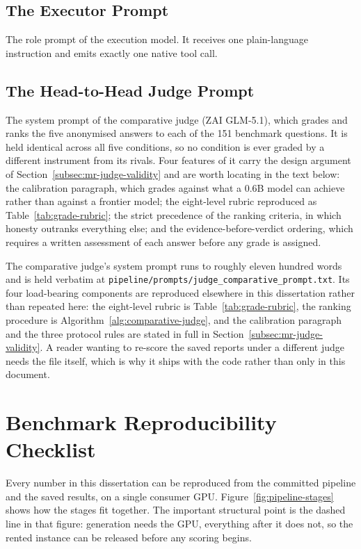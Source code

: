 \section*{The Executor Prompt}
The role prompt of the execution model. It receives one plain-language instruction and emits exactly one native tool call.



\section*{The Head-to-Head Judge Prompt}

The system prompt of the comparative judge (ZAI GLM-5.1), which grades and ranks the five anonymised answers to each of the 151 benchmark questions. It is held identical across all five conditions, so no condition is ever graded by a different instrument from its rivals. Four features of it carry the design argument of Section~\ref{subsec:mr-judge-validity} and are worth locating in the text below: the calibration paragraph, which grades against what a 0.6B model can achieve rather than against a frontier model; the eight-level rubric reproduced as Table~\ref{tab:grade-rubric}; the strict precedence of the ranking criteria, in which honesty outranks everything else; and the evidence-before-verdict ordering, which requires a written assessment of each answer before any grade is assigned.

The comparative judge's system prompt runs to roughly eleven hundred words and is held verbatim at \texttt{pipeline/prompts/judge\_comparative\_prompt.txt}. Its four load-bearing components are reproduced elsewhere in this dissertation rather than repeated here: the eight-level rubric is Table~\ref{tab:grade-rubric}, the ranking procedure is Algorithm~\ref{alg:comparative-judge}, and the calibration paragraph and the three protocol rules are stated in full in Section~\ref{subsec:mr-judge-validity}. A reader wanting to re-score the saved reports under a different judge needs the file itself, which is why it ships with the code rather than only in this document.

\chapter{Benchmark Reproducibility Checklist}
\label{chap:benchmark-reproducibility-checklist}

Every number in this dissertation can be reproduced from the committed pipeline and the saved results, on a single consumer GPU. Figure~\ref{fig:pipeline-stages} shows how the stages fit together. The important structural point is the dashed line in that figure: generation needs the GPU, everything after it does not, so the rented instance can be released before any scoring begins.

